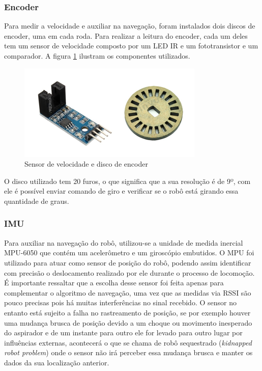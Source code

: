		\subsubsection{Encoder}
		\label{sub:encoder}
		Para medir a velocidade e auxiliar na navegação, foram instalados dois discos de encoder, uma em cada roda. Para realizar a leitura do encoder, cada um deles tem um sensor de velocidade composto por um LED IR e um fototransistor e um comparador. A figura \ref{discoeencoder} ilustram os componentes utilizados.

		\begin{figure}[h]
			\centering
			\includegraphics[scale=0.6]{figuras/discoeencoder.png}
			\caption{Sensor de velocidade e disco de encoder}
			\label{discoeencoder}
		\end{figure}

		O disco utilizado tem 20 furos, o que significa que a sua resolução é de 9º, com ele é possível enviar comando de giro e verificar se o robô está girando essa quantidade de graus.

		\subsubsection{IMU}
		\label{sub:IMU}
			Para auxiliar na navegação do robô, utilizou-se a unidade de medida inercial MPU-6050 que contém um acelerômetro e um giroscópio embutidos. O MPU foi utilizado para atuar como sensor de posição do robô, podendo assim identificar com precisão o deslocamento realizado por ele durante o processo de locomoção. É importante ressaltar que a escolha desse sensor foi feita apenas para complementar o algoritmo de navegação, uma vez que as medidas via RSSI são pouco precisas pois há muitas interferências no sinal recebido. O sensor no entanto está sujeito a falha no rastreamento de posição, se por exemplo houver uma mudança brusca de posição devido a um choque ou movimento inesperado do aspirador e de um instante para outro ele for levado para outro lugar por influências externas, acontecerá o que se chama de robô sequestrado (\textit{kidnapped robot problem}) onde o sensor não irá perceber essa mudança brusca e  manter os dados da sua localização anterior. 

